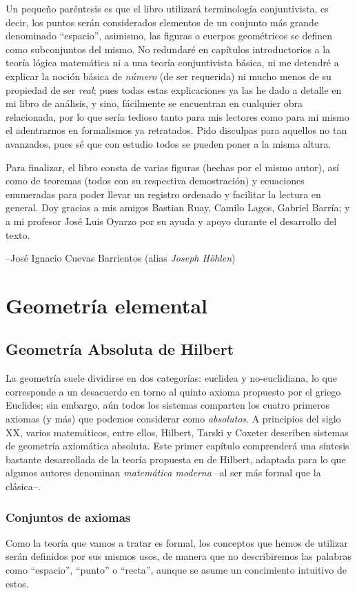 \documentclass[11pt,a4paper]{book}
\begin{document}
Un pequeño paréntesis es que el libro utilizará terminología conjuntivista, es decir, los puntos serán considerados elementos de un conjunto más grande denominado ``espacio'', asimismo, las figuras o cuerpos geométricos se definen como subconjuntos del mismo. No redundaré en capítulos introductorios a la teoría lógica matemática ni a una teoría conjuntivista básica, ni me detendré a explicar la noción básica de \textit{número} (de ser requerida) ni mucho menos de su propiedad de ser \textit{real}; pues todas estas explicaciones ya las he dado a detalle en mi libro de análisis, y sino, fácilmente se encuentran en cualquier obra relacionada, por lo que sería tedioso tanto para mis lectores como para mi mismo el adentrarnos en formalismos ya retratados. Pido disculpas para aquellos no tan avanzados, pues sé que con estudio todos se pueden poner a la misma altura.

Para finalizar, el libro consta de varias figuras (hechas por el mismo autor), así como de teoremas (todos con su respectiva demostración) y ecuaciones enumeradas para poder llevar un registro ordenado y facilitar la lectura en general. Doy gracias a mis amigos Bastian Ruay, Camilo Lagos, Gabriel Barría; y a mi profesor José Luis Oyarzo por su ayuda y apoyo durante el desarrollo del texto.

\hfill --José Ignacio Cuevas Barrientos (alias \textit{Joseph Höhlen})

\mainmatter
\part{Geometría elemental}
\chapter{Geometría Absoluta de Hilbert}
La geometría suele dividirse en dos categorías: euclidea y no-euclidiana, lo que corresponde a un desacuerdo en torno al quinto axioma propuesto por el griego Euclides; sin embargo, aún todos los sistemas comparten los cuatro primeros axiomas (y más) que podemos considerar como \textit{absolutos}. A principios del siglo XX, varios matemáticos, entre ellos, Hilbert, Tarski y Coxeter describen sistemas de geometría axiomática absoluta. Este primer capítulo comprenderá una síntesis bastante desarrollada de la teoría propuesta en  de Hilbert, adaptada para lo que algunos autores denominan \textit{matemática moderna} --al ser más formal que la clásica--. 

\section{Conjuntos de axiomas}
Como la teoría que vamos a tratar es formal, los conceptos que hemos de utilizar serán definidos por sus mismos usos, de manera que no describiremos las palabras como ``espacio'', ``punto'' o ``recta'', aunque se asume un concimiento intuitivo de estos.
\end{document}

